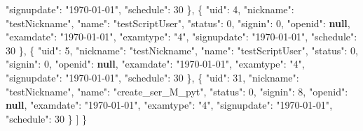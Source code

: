\documentclass[
]{article}
\newenvironment{Shaded}{}{}
\newcommand{\DataTypeTok}[1]{\textcolor[rgb]{0.56,0.13,0.00}{#1}}
\newcommand{\DecValTok}[1]{\textcolor[rgb]{0.25,0.63,0.44}{#1}}
\newcommand{\FunctionTok}[1]{\textcolor[rgb]{0.02,0.16,0.49}{#1}}
\newcommand{\KeywordTok}[1]{\textcolor[rgb]{0.00,0.44,0.13}{\textbf{#1}}}
\newcommand{\OtherTok}[1]{\textcolor[rgb]{0.00,0.44,0.13}{#1}}
\newcommand{\StringTok}[1]{\textcolor[rgb]{0.25,0.44,0.63}{#1}}
\begin{document}
\begin{Shaded}
\begin{Highlighting}[]
      \DataTypeTok{"signupdate"}\FunctionTok{:} \StringTok{"1970{-}01{-}01"}\FunctionTok{,}
      \DataTypeTok{"schedule"}\FunctionTok{:} \DecValTok{30}
    \FunctionTok{\}}\OtherTok{,}
    \FunctionTok{\{}
      \DataTypeTok{"uid"}\FunctionTok{:} \DecValTok{4}\FunctionTok{,}
      \DataTypeTok{"nickname"}\FunctionTok{:} \StringTok{"testNickname"}\FunctionTok{,}
      \DataTypeTok{"name"}\FunctionTok{:} \StringTok{"testScriptUser"}\FunctionTok{,}
      \DataTypeTok{"status"}\FunctionTok{:} \DecValTok{0}\FunctionTok{,}
      \DataTypeTok{"signin"}\FunctionTok{:} \DecValTok{0}\FunctionTok{,}
      \DataTypeTok{"openid"}\FunctionTok{:} \KeywordTok{null}\FunctionTok{,}
      \DataTypeTok{"examdate"}\FunctionTok{:} \StringTok{"1970{-}01{-}01"}\FunctionTok{,}
      \DataTypeTok{"examtype"}\FunctionTok{:} \StringTok{"4"}\FunctionTok{,}
      \DataTypeTok{"signupdate"}\FunctionTok{:} \StringTok{"1970{-}01{-}01"}\FunctionTok{,}
      \DataTypeTok{"schedule"}\FunctionTok{:} \DecValTok{30}
    \FunctionTok{\}}\OtherTok{,}
    \FunctionTok{\{}
      \DataTypeTok{"uid"}\FunctionTok{:} \DecValTok{5}\FunctionTok{,}
      \DataTypeTok{"nickname"}\FunctionTok{:} \StringTok{"testNickname"}\FunctionTok{,}
      \DataTypeTok{"name"}\FunctionTok{:} \StringTok{"testScriptUser"}\FunctionTok{,}
      \DataTypeTok{"status"}\FunctionTok{:} \DecValTok{0}\FunctionTok{,}
      \DataTypeTok{"signin"}\FunctionTok{:} \DecValTok{0}\FunctionTok{,}
      \DataTypeTok{"openid"}\FunctionTok{:} \KeywordTok{null}\FunctionTok{,}
      \DataTypeTok{"examdate"}\FunctionTok{:} \StringTok{"1970{-}01{-}01"}\FunctionTok{,}
      \DataTypeTok{"examtype"}\FunctionTok{:} \StringTok{"4"}\FunctionTok{,}
      \DataTypeTok{"signupdate"}\FunctionTok{:} \StringTok{"1970{-}01{-}01"}\FunctionTok{,}
      \DataTypeTok{"schedule"}\FunctionTok{:} \DecValTok{30}
    \FunctionTok{\}}\OtherTok{,}
    \FunctionTok{\{}
      \DataTypeTok{"uid"}\FunctionTok{:} \DecValTok{31}\FunctionTok{,}
      \DataTypeTok{"nickname"}\FunctionTok{:} \StringTok{"testNickname"}\FunctionTok{,}
      \DataTypeTok{"name"}\FunctionTok{:} \StringTok{"create\_ser\_M\_pyt"}\FunctionTok{,}
      \DataTypeTok{"status"}\FunctionTok{:} \DecValTok{0}\FunctionTok{,}
      \DataTypeTok{"signin"}\FunctionTok{:} \DecValTok{8}\FunctionTok{,}
      \DataTypeTok{"openid"}\FunctionTok{:} \KeywordTok{null}\FunctionTok{,}
      \DataTypeTok{"examdate"}\FunctionTok{:} \StringTok{"1970{-}01{-}01"}\FunctionTok{,}
      \DataTypeTok{"examtype"}\FunctionTok{:} \StringTok{"4"}\FunctionTok{,}
      \DataTypeTok{"signupdate"}\FunctionTok{:} \StringTok{"1970{-}01{-}01"}\FunctionTok{,}
      \DataTypeTok{"schedule"}\FunctionTok{:} \DecValTok{30}
    \FunctionTok{\}}
  \OtherTok{]}
\FunctionTok{\}}
\end{Highlighting}
\end{Shaded}
\end{document}
